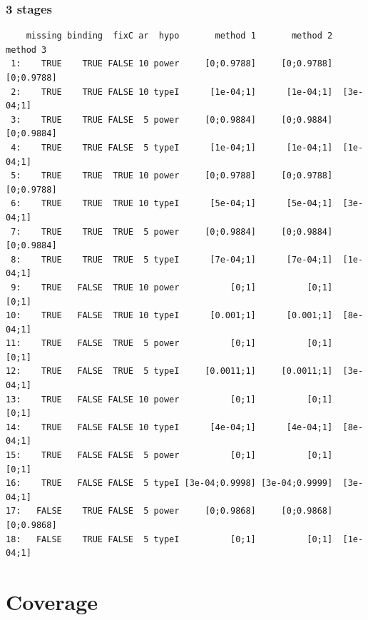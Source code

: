 \documentclass[12pt]{article}
\begin{document}
\subsubsection{3 stages}
\label{sec:org70a14fb}
\begin{verbatim}
    missing binding  fixC ar  hypo       method 1       method 2   method 3
 1:    TRUE    TRUE FALSE 10 power     [0;0.9788]     [0;0.9788] [0;0.9788]
 2:    TRUE    TRUE FALSE 10 typeI      [1e-04;1]      [1e-04;1]  [3e-04;1]
 3:    TRUE    TRUE FALSE  5 power     [0;0.9884]     [0;0.9884] [0;0.9884]
 4:    TRUE    TRUE FALSE  5 typeI      [1e-04;1]      [1e-04;1]  [1e-04;1]
 5:    TRUE    TRUE  TRUE 10 power     [0;0.9788]     [0;0.9788] [0;0.9788]
 6:    TRUE    TRUE  TRUE 10 typeI      [5e-04;1]      [5e-04;1]  [3e-04;1]
 7:    TRUE    TRUE  TRUE  5 power     [0;0.9884]     [0;0.9884] [0;0.9884]
 8:    TRUE    TRUE  TRUE  5 typeI      [7e-04;1]      [7e-04;1]  [1e-04;1]
 9:    TRUE   FALSE  TRUE 10 power          [0;1]          [0;1]      [0;1]
10:    TRUE   FALSE  TRUE 10 typeI      [0.001;1]      [0.001;1]  [8e-04;1]
11:    TRUE   FALSE  TRUE  5 power          [0;1]          [0;1]      [0;1]
12:    TRUE   FALSE  TRUE  5 typeI     [0.0011;1]     [0.0011;1]  [3e-04;1]
13:    TRUE   FALSE FALSE 10 power          [0;1]          [0;1]      [0;1]
14:    TRUE   FALSE FALSE 10 typeI      [4e-04;1]      [4e-04;1]  [8e-04;1]
15:    TRUE   FALSE FALSE  5 power          [0;1]          [0;1]      [0;1]
16:    TRUE   FALSE FALSE  5 typeI [3e-04;0.9998] [3e-04;0.9999]  [3e-04;1]
17:   FALSE    TRUE FALSE  5 power     [0;0.9868]     [0;0.9868] [0;0.9868]
18:   FALSE    TRUE FALSE  5 typeI          [0;1]          [0;1]  [1e-04;1]
\end{verbatim}

\clearpage 

\section{Coverage}
\label{sec:orgaa75db4}
\end{document}
